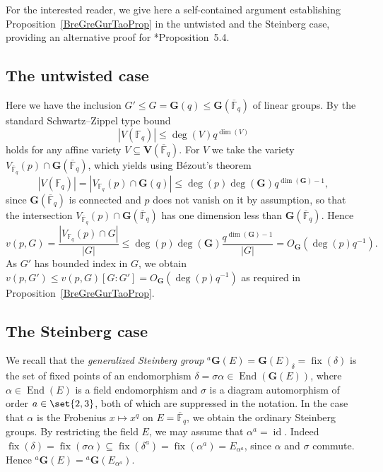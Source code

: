 \documentclass[a4paper,12pt]{amsproc}
\newcommand{\card}[1]{\left\lvert#1\right\rvert}%
\DeclareMathOperator{\End}{End}
\DeclareMathOperator{\fix}{fix}%
\DeclareMathOperator{\id}{id}%
\theoremstyle{plain}
\theoremstyle{definition}
\begin{document}
For the interested reader, we give here a self-contained argument establishing Proposition~\ref{BreGreGurTaoProp} in the untwisted and the Steinberg case, providing an alternative proof for \cite{breuillardgreenguralnicktao2015expansion}*{Proposition~5.4}.

\subsection{The untwisted case}

Here we have the inclusion $G'\leq G=\mathbf{G}(q)\leq\mathbf{G}(\overline{\mathbb{F}}_q)$ of linear groups. By the standard Schwartz--Zippel type bound 
$$
\card{V(\mathbb{F}_q)}\leq\deg(V)q^{\dim(V)}
$$ holds for any affine variety $V\subseteq\mathbf{V}(\overline{\mathbb{F}}_q)$.
For $V$ we take the variety $V_{\overline{\mathbb{F}}_q}(p)\cap\mathbf{G}(\overline{\mathbb{F}}_q)$, which yields using B\'ezout's theorem
$$
\card{V(\mathbb{F}_q)}=\card{V_{\mathbb{F}_q}(p)\cap\mathbf{G}(q)}\leq\deg(p)\deg(\mathbf{G})q^{\dim(\mathbf{G})-1},
$$
since $\mathbf{G}(\overline{\mathbb{F}}_q)$ is connected and $p$ does not vanish on it by assumption, so that the intersection $V_{\overline{\mathbb{F}}_q}(p)\cap\mathbf{G}(\overline{\mathbb{F}}_q)$ has one dimension less than $\mathbf{G}(\overline{\mathbb{F}}_q)$. Hence
$$
v(p,G)=\frac{\card{V_{\mathbb{F}_q}(p)\cap G}}{\card{G}}\leq\deg(p)\deg(\mathbf{G})\frac{q^{\dim(\mathbf{G})-1}}{\card{G}}=O_{\mathbf{G}}(\deg(p) q^{-1}).
$$
As $G'$ has bounded index in $G$, we obtain $v(p,G')\leq v(p,G)[G:G']=O_{\mathbf{G}}(\deg(p)q^{-1})$ as required in Proposition~\ref{BreGreGurTaoProp}.

\subsection{The Steinberg case}

We recall that the \emph{generalized Steinberg group} ${}^a\mathbf{G}(E)=\mathbf{G}(E)_\delta=\fix(\delta)$ is the set of fixed points of an endomorphism $\delta=\sigma\alpha\in\End(\mathbf{G}(E))$, where $\alpha\in\End(E)$ is a field endomorphism and $\sigma$ is a diagram automorphism of order $a\in\set{2,3}$, both of which are suppressed in the notation. In the case that $\alpha$ is the Frobenius $x\mapsto x^q$ on $E=\overline{\mathbb{F}}_q$, we obtain the ordinary Steinberg groups. By restricting the field $E$, we may assume that $\alpha^a=\id$. Indeed $\fix(\delta)=\fix(\sigma\alpha)\subseteq\fix(\delta^a)=\fix(\alpha^a)=E_{\alpha^a}$, since $\alpha$ and $\sigma$ commute. Hence ${}^a\mathbf{G}(E)={}^a\mathbf{G}(E_{\alpha^a})$.
\end{document}
